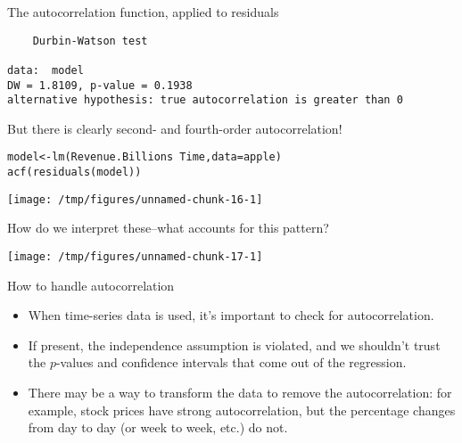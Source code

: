 \documentclass{beamer}\usepackage[]{graphicx}\usepackage[]{color}
\makeatletter
\def\maxwidth{ %
  \ifdim\Gin@nat@width>\linewidth
    \linewidth
  \else
    \Gin@nat@width
  \fi
}
\newcommand{\hlopt}[1]{\textcolor[rgb]{1,0.894,0.769}{#1}}%
\newcommand{\hlstd}[1]{\textcolor[rgb]{1,0.894,0.769}{#1}}%
\newcommand{\hlkwb}[1]{\textcolor[rgb]{0.804,0.776,0.451}{#1}}%
\newcommand{\hlkwc}[1]{\textcolor[rgb]{0.78,0.941,0.545}{#1}}%
\newcommand{\hlkwd}[1]{\textcolor[rgb]{1,0.78,0.769}{#1}}%
\newenvironment{kframe}{%
 \def\at@end@of@kframe{}%
 \ifinner\ifhmode%
  \def\at@end@of@kframe{\end{minipage}}%
  \begin{minipage}{\columnwidth}%
 \fi\fi%
 \def\FrameCommand##1{\hskip\@totalleftmargin \hskip-\fboxsep
 \colorbox{shadecolor}{##1}\hskip-\fboxsep
     \hskip-\linewidth \hskip-\@totalleftmargin \hskip\columnwidth}%
 \MakeFramed {\advance\hsize-\width
   \@totalleftmargin\z@ \linewidth\hsize
   \@setminipage}}%
 {\par\unskip\endMakeFramed%
 \at@end@of@kframe}
\newenvironment{knitrout}{}{} %
\makeatother
\begin{document}
\begin{darkframes}
\begin{frame}[fragile]{The autocorrelation function, applied to residuals}
\begin{knitrout}
\begin{kframe}
\begin{verbatim}
	Durbin-Watson test

data:  model
DW = 1.8109, p-value = 0.1938
alternative hypothesis: true autocorrelation is greater than 0
\end{verbatim}
\end{kframe}
\end{knitrout}
    \end{frame}

    \begin{frame}[fragile]

      But there is clearly second- and fourth-order autocorrelation!

\begin{knitrout}
\color{fgcolor}\begin{kframe}
\begin{alltt}
\hlstd{model} \hlkwb{<-} \hlkwd{lm}\hlstd{(Revenue.Billions} \hlopt{~} \hlstd{Time,} \hlkwc{data}\hlstd{=apple)}
\hlkwd{acf}\hlstd{(}\hlkwd{residuals}\hlstd{(model))}
\end{alltt}
\end{kframe}
\texttt{[image: /tmp/figures/unnamed-chunk-16-1]} 

\end{knitrout}

      How do we interpret these--what accounts for this pattern?
    \end{frame}

    \begin{frame}
\begin{knitrout}
\color{fgcolor}
\texttt{[image: /tmp/figures/unnamed-chunk-17-1]} 

\end{knitrout}
    \end{frame}

    \begin{frame}{How to handle autocorrelation}
      \begin{itemize}[<+->]
        \item When time-series data is used, it's important to check for autocorrelation.
        \item If present, the independence assumption is violated, and we shouldn't trust the $p$-values and confidence intervals that come out of the regression.
        \item There may be a way to transform the data to remove the autocorrelation: for example, stock prices have strong autocorrelation, but the percentage changes from day to day (or week to week, etc.) do not.
      \end{itemize}
    \end{frame}


\end{darkframes}
\end{document}
